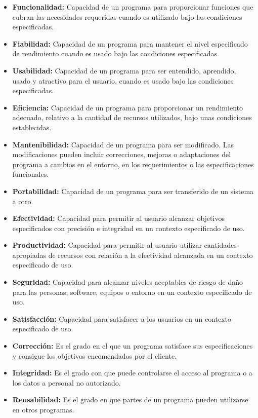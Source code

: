 \documentclass[12pt,letterpaper]{article}
\begin{document}
\begin{enumerate}
		\begin{itemize}
			\item \textbf{Funcionalidad:} Capacidad de un programa para proporcionar funciones que cubran las necesidades requeridas cuando es utilizado bajo las condiciones especificadas.
			\item \textbf{Fiabilidad:} Capacidad de un programa para mantener el nivel especificado de rendimiento cuando es usado bajo las condiciones especificadas.
			\item \textbf{Usabilidad:} Capacidad de un programa para ser entendido, aprendido, usado y atractivo para el usuario, cuando es usado bajo las condiciones especificadas.
			\item \textbf{Eficiencia:} Capacidad de un programa para proporcionar un rendimiento adecuado, relativo a la cantidad de recursos utilizados, bajo unas condiciones establecidas.
			\item \textbf{Mantenibilidad:} Capacidad de un programa para ser modificado. Las modificaciones pueden incluir correcciones, mejoras o adaptaciones del programa a cambios en el entorno, en los requerimientos o las especificaciones funcionales.
			\item \textbf{Portabilidad:} Capacidad de un programa para ser transferido de un sistema a otro.
			\item \textbf{Efectividad:} Capacidad para permitir al usuario alcanzar objetivos especificados con precisión e integridad en un contexto especificado de uso.
			\item \textbf{Productividad:} Capacidad para permitir al usuario utilizar cantidades apropiadas de recursos con relación a la efectividad alcanzada en un contexto especificado de uso.
			\item \textbf{Seguridad:} Capacidad para alcanzar niveles aceptables de riesgo de daño para las personas, software, equipos o entorno en un contexto especificado de uso.
			\item \textbf{Satisfacción:} Capacidad para satisfacer a los usuarios en un contexto especificado de uso.
			\item \textbf{Corrección:} Es el grado en el que un programa satisface sus especificaciones y consigue los objetivos encomendados por el cliente.
			\item \textbf{Integridad:} Es el grado con que puede controlarse el acceso al programa o a los datos a personal no autorizado.
			\item \textbf{Reusabilidad:} Es el grado en que partes de un programa pueden utilizarse en otros programas.
		\end{itemize}
	\end{enumerate}
\end{document}
